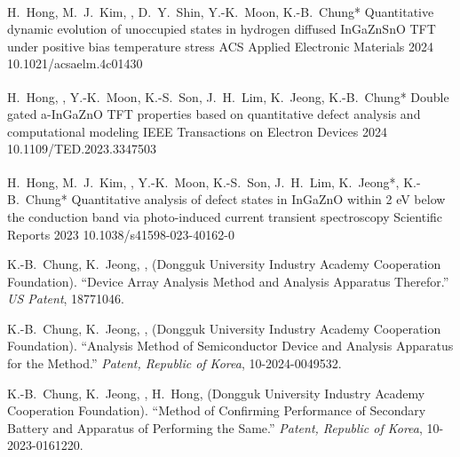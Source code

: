 \documentclass[11pt, a4paper]{awesome-cv}
\begin{document}
\begin{cvitems}
  \pub
    {H.~Hong\textsuperscript{\dag}, M.~J.~Kim, , D.~Y.~Shin, Y.-K.~Moon, K.-B.~Chung*}
    {Quantitative dynamic evolution of unoccupied states in hydrogen diffused InGaZnSnO TFT under positive bias temperature stress}
    {ACS Applied Electronic Materials}
    {2024}
    {10.1021/acsaelm.4c01430}

  \pub
    {H.~Hong\textsuperscript{\dag}, , Y.-K.~Moon, K.-S.~Son, J.~H.~Lim, K.~Jeong, K.-B.~Chung*}
    {Double gated a-InGaZnO TFT properties based on quantitative defect analysis and computational modeling}
    {IEEE Transactions on Electron Devices}
    {2024}
    {10.1109/TED.2023.3347503}

  \pub
    {H.~Hong\textsuperscript{\dag}, M.~J.~Kim, , Y.-K.~Moon, K.-S.~Son, J.~H.~Lim, K.~Jeong*, K.-B.~Chung*}
    {Quantitative analysis of defect states in InGaZnO within 2 eV below the conduction band via photo-induced current transient spectroscopy}
    {Scientific Reports}
    {2023}
    {10.1038/s41598-023-40162-0}
\end{cvitems}


\setcounter{patnum}{4}  %
\providecommand{\patentitem}[1]{%
  \addtocounter{patnum}{-1}%
  \item[\textbf{\arabic{patnum}.}] {#1}%
}

\begin{cvitems}
  \patentitem
    {K.-B.~Chung, K.~Jeong, , (Dongguk University Industry Academy Cooperation Foundation). ``Device Array Analysis Method and Analysis Apparatus Therefor.'' \textit{US Patent}, 18771046.}
  \patentitem
    {K.-B.~Chung, K.~Jeong, , (Dongguk University Industry Academy Cooperation Foundation). ``Analysis Method of Semiconductor Device and Analysis Apparatus for the Method.'' \textit{Patent, Republic of Korea}, 10-2024-0049532.}
  \patentitem
    {K.-B.~Chung, K.~Jeong, , H.~Hong, (Dongguk University Industry Academy Cooperation Foundation). ``Method of Confirming Performance of Secondary Battery and Apparatus of Performing the Same.'' \textit{Patent, Republic of Korea}, 10-2023-0161220.}
\end{cvitems}

\end{document}
